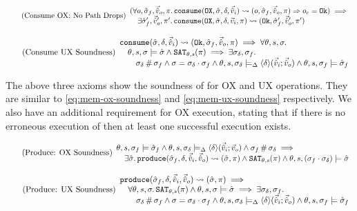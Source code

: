 \begin{equation}
\tag{Consume OX: No Path Drops}\label{eq:consume-ox-no-drop}
\begin{array}{l}
(\forall o, \hat{\sigma}_f,\vec{\hat{v}}_o,\pi \ldotp \texttt{consume}(\texttt{OX},\hat{\sigma},\delta,\vec{\hat{v}}_i)\rightsquigarrow (o, \hat{\sigma}_f, \vec{\hat{v}}_o, \pi)\Rightarrow o_c = \texttt{Ok}) \implies \\
\quad \exists  \hat{\sigma}_f',\vec{\hat{v}}_o',\pi' \ldotp \texttt{consume}(\texttt{OX}, \hat{\sigma}, \delta,\vec{v}_i,\pi)\rightsquigarrow (\texttt{Ok}, \hat{\sigma}_f', \vec{\hat{v}}_o', \pi')
\end{array}
\end{equation}

\begin{equation}
\tag{Consume UX Soundness}\label{eq:consume-ux-sound}
\begin{array}{l}
\texttt{consume}(\hat{\sigma},\delta,\vec{\hat{v}}_i)\rightsquigarrow (\texttt{Ok},\hat{\sigma}_f,\vec{\hat{v}}_o,\pi) \implies \forall \theta,s,\sigma\ldotp \\
\quad  \theta,s,\sigma\models \hat{\sigma} \land \texttt{SAT}_{\mathit{\theta,s}}(\pi) \implies \exists \sigma_\delta, \sigma_f\ldotp\\
\qquad \sigma_\delta\operatorname{\#}\sigma_f \land \sigma=\sigma_\delta\cdot\sigma_f \land \theta, s, \sigma_\delta \models_{\Delta} \left<\delta\right>\!(\vec{\hat{v}}_i;\vec{\hat{v}}_o) \land \theta,s,\sigma_f\models \hat{\sigma}_f
\end{array}
\end{equation}

The above three axioms show the soundness of \consume{} for OX and UX operations. They are similar to \ref{eq:mem-ox-soundness} and \ref{eq:mem-ux-soundness} respectively. We also have an additional requirement for OX execution, stating that if there is no erroneous execution of \consume{} then at least one successful execution exists.

\begin{equation}
\tag{Produce: OX Soundness}\label{eq:produce-ox-sound}
\begin{array}{l}
\theta, s, \sigma_f \models \hat{\sigma}_f \land \theta, s, \sigma_\delta \models_{\Delta} \left<\delta\right>\!(\vec{\hat{v}}_i;\vec{v}_o) \land \sigma_f\operatorname{\#}\sigma_\delta \implies \\
\quad \exists \hat{\sigma}\ldotp \texttt{produce}(\hat{\sigma}_f,\delta,\vec{\hat{v}}_i,\vec{\hat{v}}_o)\rightsquigarrow (\hat{\sigma},\pi) \land \texttt{SAT}_{\mathit{\theta,s}}(\pi) \land \theta,s,(\sigma_f\cdot\sigma_\delta) \models \hat{\sigma}
\end{array}
\end{equation}

\begin{equation}
\tag{Produce: UX Soundness}\label{eq:produce-ux-sound}
\begin{array}{l}
\texttt{produce}(\hat{\sigma}_f,\delta,\vec{\hat{v}}_i,\vec{\hat{v}}_o)\rightsquigarrow (\hat{\sigma}, \pi) \implies\\
\quad \forall\theta,s,\sigma\ldotp \texttt{SAT}_{\mathit{\theta,s}}(\pi) \land \theta,s,\sigma\models\hat{\sigma} \implies \exists \sigma_\delta, \sigma_f\ldotp \\
\qquad \sigma_\delta\operatorname{\#}\sigma_f \land \sigma=\sigma_\delta\cdot\sigma_f \land \theta,s,\sigma_\delta \models_{\Delta} \left<\delta\right>\!(\vec{\hat{v}}_i;\vec{\hat{v}}_o) \land \theta,s,\sigma_f \models \hat{\sigma}_f
\end{array}
\end{equation}

